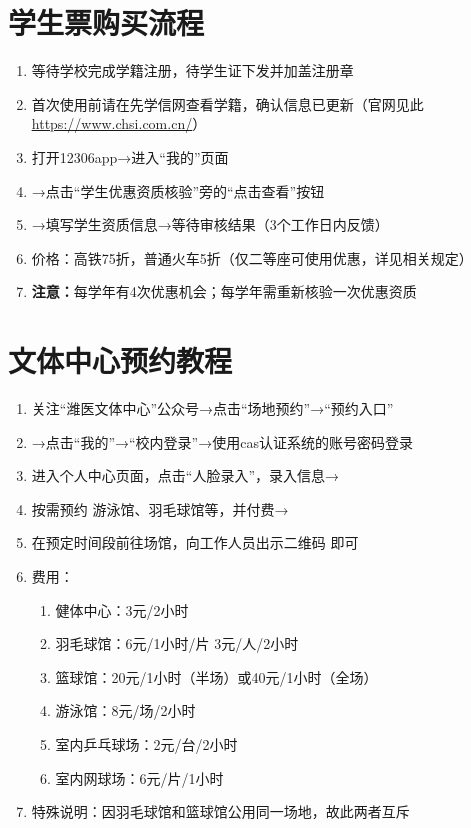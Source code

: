 \section[学生票购买流程]{学生票购买\footnotemark 流程}
\begin{enumerate}
    \item 等待学校完成学籍注册，待学生证下发并加盖注册章
    \item 首次使用前请在先学信网查看学籍，确认信息已更新（官网见此\uline{\href{https://www.chsi.com.cn/}{https://www.chsi.com.cn/}}）
    \item 打开12306app→进入“我的”页面
    \item →点击“学生优惠资质核验”旁的“点击查看”按钮
    \item →填写学生资质信息→等待审核结果（3个工作日内反馈）
    \item 价格：高铁75折，普通火车5折（仅二等座可使用优惠，详见相关规定）
    \item \textbf{注意：}每学年\footnotemark 有4次优惠机会；每学年需重新核验一次优惠资质
\end{enumerate}

\section[文体中心预约教程]{文体中心预约教程}
\label{sports_center}
\begin{enumerate}
    \item 关注“潍医文体中心”公众号→点击“场地预约”→“预约入口”
    \item →点击“我的”→“校内登录”→使用cas认证系统的账号密码登录
    \item 进入个人中心页面，点击“人脸录入”，录入信息→
    \item 按需预约 游泳馆、羽毛球馆等，并付费→
    \item 在预定时间段前往场馆，向工作人员出示二维码 即可
    \item 费用：
          \begin{enumerate}
              \item 健体中心：3元/2小时
              \item 羽毛球馆\footnotemark：6元/1小时/片 3元/人/2小时
              \item 篮球馆：20元/1小时（半场）或40元/1小时（全场）
              \item 游泳馆\footnotemark：8元/场/2小时
              \item 室内乒乓球场：2元/台/2小时
              \item 室内网球场：6元/片/1小时
          \end{enumerate}
    \item 特殊说明：因羽毛球馆和篮球馆公用同一场地，故此两者互斥
\end{enumerate}
